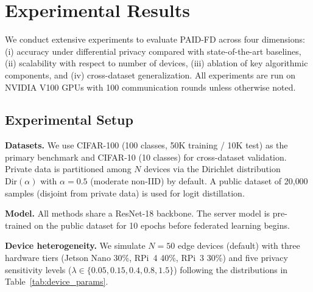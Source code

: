 %

\section{Experimental Results}\label{sec:results}

We conduct extensive experiments to evaluate PAID-FD across four dimensions:
(i) accuracy under differential privacy compared with state-of-the-art baselines,
(ii) scalability with respect to number of devices,
(iii) ablation of key algorithmic components, and
(iv) cross-dataset generalization.
All experiments are run on NVIDIA V100 GPUs with 100 communication rounds
unless otherwise noted.

\subsection{Experimental Setup}\label{sec:setup}

\textbf{Datasets.}
We use CIFAR-100 (100 classes, 50K training / 10K test) as the primary
benchmark and CIFAR-10 (10 classes) for cross-dataset validation.
Private data is partitioned among $N$ devices via the Dirichlet distribution
$\text{Dir}(\alpha)$ with $\alpha = 0.5$ (moderate non-IID) by default.
A public dataset of 20{,}000 samples (disjoint from private data) is used
for logit distillation.

\textbf{Model.}
All methods share a ResNet-18 backbone. The server model is pre-trained on
the public dataset for 10 epochs before federated learning begins.

\textbf{Device heterogeneity.}
We simulate $N = 50$ edge devices (default) with three hardware tiers
(Jetson Nano 30\%, RPi~4 40\%, RPi~3 30\%) and five privacy sensitivity
levels ($\lambda \in \{0.05, 0.15, 0.4, 0.8, 1.5\}$) following the
distributions in Table~\ref{tab:device_params}.

